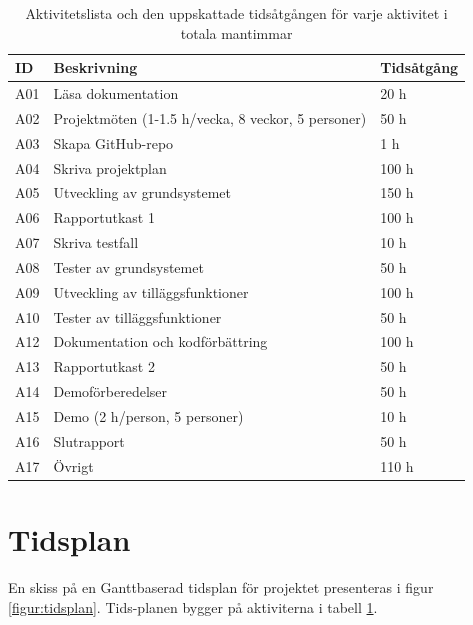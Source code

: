 \documentclass[a4paper]{article}
\begin{document}
\begin{table}[t]
\centering
\begin{tabular}{| l | l | l |}
\hline
\textbf{ID} & \textbf{Beskrivning} & \textbf{Tidsåtgång} \\ \hline
A01 & Läsa dokumentation & 20 h \\ \hline
A02 & Projektmöten (1-1.5 h/vecka, 8 veckor, 5 personer) & 50 h \\ \hline
A03 & Skapa GitHub-repo & 1 h \\ \hline
A04 & Skriva projektplan & 100 h \\ \hline
A05 & Utveckling av grundsystemet & 150 h \\ \hline
A06 & Rapportutkast 1 & 100 h \\ \hline
A07 & Skriva testfall & 10 h \\ \hline
A08 & Tester av grundsystemet & 50 h \\ \hline
A09 & Utveckling av tilläggsfunktioner & 100 h \\ \hline
A10 & Tester av tilläggsfunktioner & 50 h \\ \hline
A12 & Dokumentation och kodförbättring & 100 h \\ \hline
A13 & Rapportutkast 2 & 50 h \\ \hline
A14 & Demoförberedelser & 50 h \\ \hline
A15 & Demo (2 h/person, 5 personer) & 10 h \\ \hline
A16 & Slutrapport & 50 h \\ \hline
A17 & Övrigt & 110 h \\ \hline
\end{tabular}
\caption{Aktivitetslista och den uppskattade tidsåtgången för varje aktivitet i totala mantimmar}
\label{tabell:aktiviteter}
\end{table}

\section{Tidsplan}
\label{sec:tidsplan}

En skiss på en Ganttbaserad tidsplan för projektet presenteras i figur \ref{figur:tidsplan}. Tids-planen bygger på aktiviterna i tabell \ref{tabell:aktiviteter}.
\end{document}
